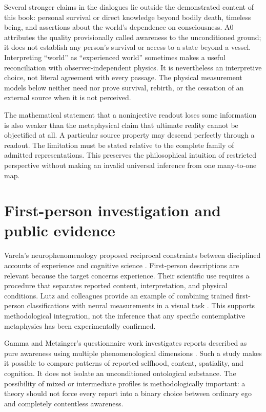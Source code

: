 Several stronger claims in the dialogues lie outside the demonstrated content of this book: personal survival or direct knowledge beyond bodily death, timeless being, and assertions about the world's dependence on consciousness. A0 attributes the quality provisionally called awareness to the unconditioned ground; it does not establish any person's survival or access to a state beyond a vessel. Interpreting ``world'' as ``experienced world'' sometimes makes a useful reconciliation with observer-independent physics. It is nevertheless an interpretive choice, not literal agreement with every passage. The physical measurement models below neither need nor prove survival, rebirth, or the cessation of an external source when it is not perceived.

The mathematical statement that a noninjective readout loses some information is also weaker than the metaphysical claim that ultimate reality cannot be objectified at all. A particular source property may descend perfectly through a readout. The limitation must be stated relative to the complete family of admitted representations. This preserves the philosophical intuition of restricted perspective without making an invalid universal inference from one many-to-one map.

\section{First-person investigation and public evidence}\label{section:book:first-person-investigation-and-public-evidence}
Varela's neurophenomenology proposed reciprocal constraints between disciplined accounts of experience and cognitive science \cite{Varela1996}. First-person descriptions are relevant because the target concerns experience. Their scientific use requires a procedure that separates reported content, interpretation, and physical conditions. Lutz and colleagues provide an example of combining trained first-person classifications with neural measurements in a visual task \cite{Lutz2002}. This supports methodological integration, not the inference that any specific contemplative metaphysics has been experimentally confirmed.

Gamma and Metzinger's questionnaire work investigates reports described as pure awareness using multiple phenomenological dimensions \cite{Gamma2021}. Such a study makes it possible to compare patterns of reported selfhood, content, spatiality, and cognition. It does not isolate an unconditioned ontological substance. The possibility of mixed or intermediate profiles is methodologically important: a theory should not force every report into a binary choice between ordinary ego and completely contentless awareness.


